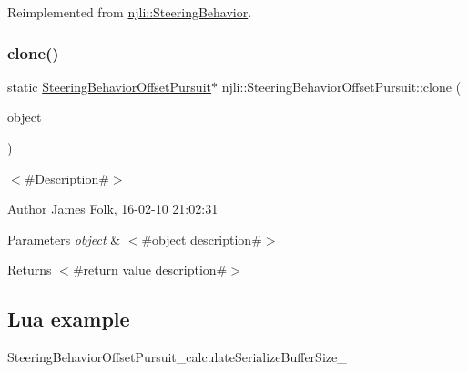 Reimplemented from \mbox{\hyperlink{classnjli_1_1_steering_behavior_abbc461d853c1b225cfde5b79d96d11bd}{njli\+::\+Steering\+Behavior}}.

\mbox{\label{classnjli_1_1_steering_behavior_offset_pursuit_a480c07a4694dcc7dbefbb698d5d22a76}} 
\subsubsection{\texorpdfstring{clone()}{clone()}}
{\footnotesize\ttfamily static \mbox{\hyperlink{classnjli_1_1_steering_behavior_offset_pursuit}{Steering\+Behavior\+Offset\+Pursuit}}$\ast$ njli\+::\+Steering\+Behavior\+Offset\+Pursuit\+::clone (\begin{DoxyParamCaption}\item[{const \mbox{\hyperlink{classnjli_1_1_steering_behavior_offset_pursuit}{Steering\+Behavior\+Offset\+Pursuit}} \&}]{object }\end{DoxyParamCaption})\hspace{0.3cm}{\ttfamily [static]}}



$<$\#\+Description\#$>$ 

\begin{DoxyAuthor}{Author}
James Folk, 16-\/02-\/10 21\+:02\+:31
\end{DoxyAuthor}

\begin{DoxyParams}{Parameters}
{\em object} & $<$\#object description\#$>$\\
\hline
\end{DoxyParams}
\begin{DoxyReturn}{Returns}
$<$\#return value description\#$>$
\end{DoxyReturn}
\hypertarget{classnjli_1_1_steering_behavior_wander_ex1}{}\subsection{Lua example}\label{classnjli_1_1_steering_behavior_wander_ex1}

\begin{DoxyCodeInclude}
\end{DoxyCodeInclude}
Steering\+Behavior\+Offset\+Pursuit\+\_\+calculate\+Serialize\+Buffer\+Size\+\_\+ \mbox{\label{classnjli_1_1_steering_behavior_offset_pursuit_a37e95a44ceacb1e5cbcf2b496743db3f}} 
